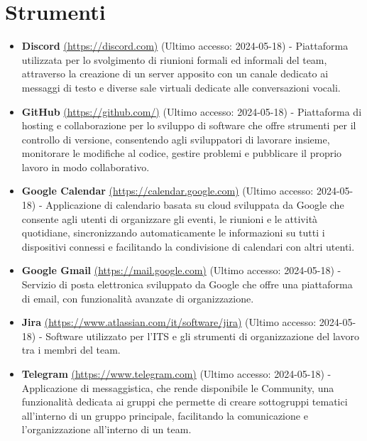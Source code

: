\section{Strumenti}
\begin{itemize}
    \item \textbf{Discord} \href{https://discord.com}{(https://discord.com)} (Ultimo accesso: 2024-05-18) - Piattaforma utilizzata per lo svolgimento di riunioni formali ed informali del team, attraverso la creazione di un server apposito con un canale dedicato ai messaggi di testo e diverse sale virtuali dedicate alle conversazioni vocali.
    
    \item \textbf{GitHub} \href{https://github.com/}{(https://github.com/)} (Ultimo accesso: 2024-05-18) - Piattaforma di hosting e collaborazione per lo sviluppo di software che offre strumenti per il controllo di versione, consentendo agli sviluppatori di lavorare insieme, monitorare le modifiche al codice, gestire problemi e pubblicare il proprio lavoro in modo collaborativo.
    
    \item \textbf{Google Calendar} \href{https://calendar.google.com}{(https://calendar.google.com)} (Ultimo accesso: 2024-05-18) - Applicazione di calendario basata su cloud sviluppata da Google che consente agli utenti di organizzare gli eventi, le riunioni e le attività quotidiane, sincronizzando automaticamente le informazioni su tutti i dispositivi connessi e facilitando la condivisione di calendari con altri utenti.
    
    \item \textbf{Google Gmail} \href{https://mail.google.com}{(https://mail.google.com)} (Ultimo accesso: 2024-05-18) - Servizio di posta elettronica sviluppato da Google che offre una piattaforma di email, con funzionalità avanzate di organizzazione.
    
    \item \textbf{Jira} \href{https://www.atlassian.com/it/software/jira}{(https://www.atlassian.com/it/software/jira)} (Ultimo accesso: 2024-05-18) - Software utilizzato per l'ITS e gli strumenti di organizzazione del lavoro tra i membri del team.
    
    \item \textbf{Telegram} \href{https://www.telegram.com}{(https://www.telegram.com)} (Ultimo accesso: 2024-05-18) - Applicazione di messaggistica, che rende disponibile le Community, una funzionalità dedicata ai gruppi che permette di creare sottogruppi tematici all'interno di un gruppo principale, facilitando la comunicazione e l'organizzazione all'interno di un team.
    

\end{itemize}

